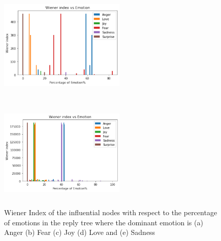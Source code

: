 \documentclass[acmtog]{acmart}
\begin{document}
\begin{figure}[h]
\begin{minipage}{.33\textwidth}
    \includegraphics[width=6cm,height=5.5cm,keepaspectratio]{plots/weiner_love.pdf}
  \end{minipage}%
  \begin{minipage}{.33\textwidth}
    \centering
    \includegraphics[width=6cm,height=5.5cm,keepaspectratio]{plots/weiner_sad.pdf}
  \end{minipage}
  
  \caption{Wiener Index of the influential nodes with respect to the percentage of emotions in the reply tree where the dominant emotion is (a) Anger (b) Fear (c) Joy (d) Love and (e) Sadness}
  \label{SampleConvw}
  \end{figure}
\end{document}
